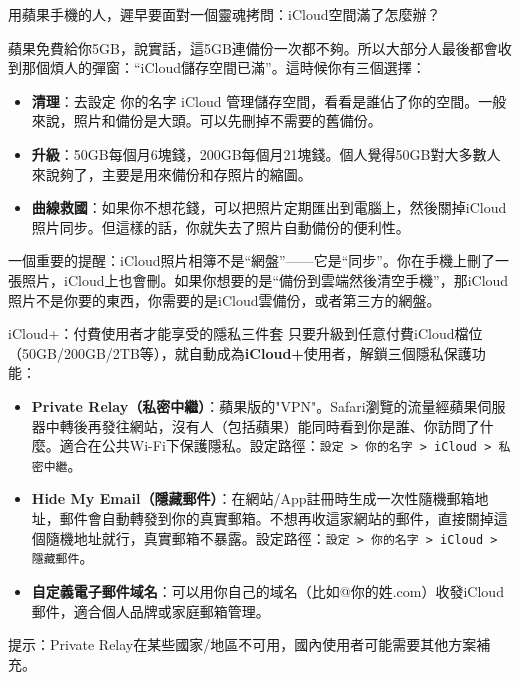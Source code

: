 用蘋果手機的人，遲早要面對一個靈魂拷問：iCloud空間滿了怎麼辦？

蘋果免費給你5GB，說實話，這5GB連備份一次都不夠。所以大部分人最後都會收到那個煩人的彈窗：“iCloud儲存空間已滿”。這時候你有三個選擇：

\begin{itemize}
  \item \textbf{清理}：去設定 你的名字 iCloud 管理儲存空間，看看是誰佔了你的空間。一般來說，照片和備份是大頭。可以先刪掉不需要的舊備份。
  \item \textbf{升級}：50GB每個月6塊錢，200GB每個月21塊錢。個人覺得50GB對大多數人來說夠了，主要是用來備份和存照片的縮圖。
  \item \textbf{曲線救國}：如果你不想花錢，可以把照片定期匯出到電腦上，然後關掉iCloud照片同步。但這樣的話，你就失去了照片自動備份的便利性。
\end{itemize}

一個重要的提醒：iCloud照片相簿不是“網盤”——它是“同步”。你在手機上刪了一張照片，iCloud上也會刪。如果你想要的是“備份到雲端然後清空手機”，那iCloud照片不是你要的東西，你需要的是iCloud雲備份，或者第三方的網盤。

\begin{tcbinfo}{iCloud+：付費使用者才能享受的隱私三件套}
只要升級到任意付費iCloud檔位（50GB/200GB/2TB等），就自動成為\textbf{iCloud+}使用者，解鎖三個隱私保護功能：

\begin{itemize}
  \item \textbf{Private Relay（私密中繼）}：蘋果版的"VPN"。Safari瀏覽的流量經蘋果伺服器中轉後再發往網站，沒有人（包括蘋果）能同時看到你是誰、你訪問了什麼。適合在公共Wi-Fi下保護隱私。設定路徑：\texttt{設定 > 你的名字 > iCloud > 私密中繼}。
  \item \textbf{Hide My Email（隱藏郵件）}：在網站/App註冊時生成一次性隨機郵箱地址，郵件會自動轉發到你的真實郵箱。不想再收這家網站的郵件，直接關掉這個隨機地址就行，真實郵箱不暴露。設定路徑：\texttt{設定 > 你的名字 > iCloud > 隱藏郵件}。
  \item \textbf{自定義電子郵件域名}：可以用你自己的域名（比如@你的姓.com）收發iCloud郵件，適合個人品牌或家庭郵箱管理。
\end{itemize}

提示：Private Relay在某些國家/地區不可用，國內使用者可能需要其他方案補充。

\end{tcbinfo}

